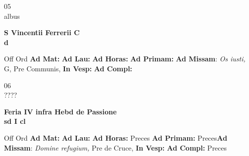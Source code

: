 \documentclass[10pt, openany]{book}
\begin{document}
    \begin{center}
        \begin{minipage}{3.5in}
            \vspace{2em}
            \begin{minipage}{0.5in}
                {\Huge 05} \\
                {\normalsize albus}
            \end{minipage}
            \begin{minipage}{3.0in}
                \textbf{ \large S Vincentii Ferrerii C \\
                \textnormal{\normalsize d}}

            \end{minipage}
            \begin{justify}Off Ord
                \textbf{Ad Mat: }
                \textbf{Ad Lau: }
                \textbf{Ad Horas: }
                \textbf{Ad Primam: }\textbf{Ad Missam}: \textit{Os iusti,} G, Pre Communis, 
                \textbf{In Vesp: }
                \textbf{Ad Compl: }
            \end{justify}
        \end{minipage}
    \end{center}

    \begin{center}
        \begin{minipage}{3.5in}
            \vspace{2em}
            \begin{minipage}{0.5in}
                {\Huge 06} \\
                {\normalsize ????}
            \end{minipage}
            \begin{minipage}{3.0in}
                \textbf{ \large Feria IV infra Hebd de Passione \\
                \textnormal{\normalsize sd I cl}}

            \end{minipage}
            \begin{justify}Off Ord
                \textbf{Ad Mat: }
                \textbf{Ad Lau: }
                \textbf{Ad Horas: }Preces
                \textbf{Ad Primam: }Preces\textbf{Ad Missam}: \textit{Domine refugium,} Pre de Cruce, 
                \textbf{In Vesp: }
                \textbf{Ad Compl: }Preces
            \end{justify}
        \end{minipage}
    \end{center}
\end{document}
